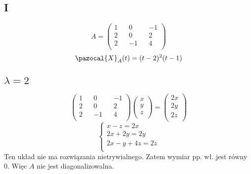 \documentclass{article}
\begin{document}
\subsection*{I}
$$
A=
\begin{pmatrix}
1 && 0 && -1\\
2 && 0 && 2\\
2 && -1 && 4\\
\end{pmatrix}
$$
$$
\pazocal{X}_A(t) = (t-2)^2(t-1)
$$
\subsection*{$\lambda = 2$}
$$
\begin{pmatrix}
1 && 0 && -1\\
2 && 0 && 2\\
2 && -1 && 4\\
\end{pmatrix}
\begin{pmatrix}
x\\
y\\
z\\
\end{pmatrix}=
\begin{pmatrix}
2x\\
2y\\
2z\\
\end{pmatrix}
$$
$$
\begin{cases}
x - z = 2x\\
2x + 2y = 2y\\
2x - y + 4z = 2z\\
\end{cases}
$$
Ten układ nie ma rozwiązania nietrywialnego. Zatem wymiar pp. wł. jest równy 0. Więc $A$ nie jest diagonalizowalna.
\end{document}
